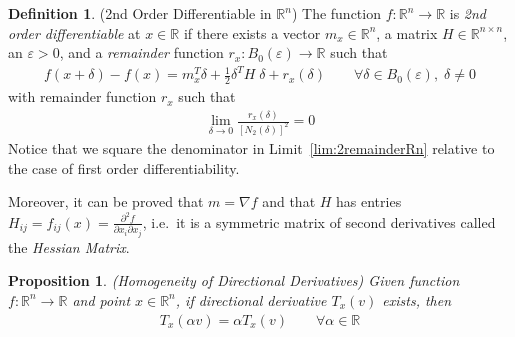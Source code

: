 \documentclass[12pt]{article}
\numberwithin{equation}{section} %
\theoremstyle{plain}
\newtheorem{prop}[thm]{Proposition}
\theoremstyle{definition}
\newtheorem{defn}[thm]{Definition}
\theoremstyle{remark}
\newcommand{\R}{\mathbb{R}}
\newcommand{\Rn}{\mathbb{R}^n}
\newcommand{\Rnn}{\mathbb{R}^{n\times n}}
\begin{document}
\begin{defn}{(2nd Order Differentiable in $\Rn$)}
\label{defn:2diffableRn}
The function $f:\Rn\rightarrow\R$ is \emph{2nd order differentiable} at
$x\in\R$ if there exists a vector $m_x\in\Rn$, a matrix $H\in\Rnn$, an
$\varepsilon>0$, and a \emph{remainder} function
$r_x:B_0(\varepsilon)\rightarrow\R$ such that
\begin{align}
  \label{eq:2diffapproxRn}
  f(x+\delta)-f(x)
  = m_x^T \delta
  + \frac{1}{2}\delta^T H \;\delta
  + r_x(\delta)
  \qquad \forall \delta\in B_0(\varepsilon), \; \delta \neq 0
\end{align}
with remainder function $r_x$ such that
\begin{align}
  \label{lim:2remainderRn}
  \lim_{\delta\rightarrow 0}
  \frac{r_x(\delta)}{[N_2(\delta)]^2}=0
\end{align}
Notice that we square the denominator in Limit~\ref{lim:2remainderRn}
relative to the case of first order differentiability.

Moreover, it can be proved that $m=\nabla f$ and that $H$ has entries
$H_{ij} = f_{ij}(x) = \frac{\partial^2 f}{\partial x_i\partial x_j}$,
i.e.\ it is a symmetric matrix of second derivatives called the
\emph{Hessian Matrix}.
\end{defn}

\begin{prop}{\emph{(Homogeneity of Directional Derivatives)}}
Given function $f:\Rn\rightarrow\R$ and point $x\in\Rn$, if directional
derivative $T_x(v)$ exists, then
\begin{align*}
  T_x(\alpha v) = \alpha T_x(v)
  \qquad\forall\alpha\in\R
\end{align*}
\end{prop}
\end{document}
